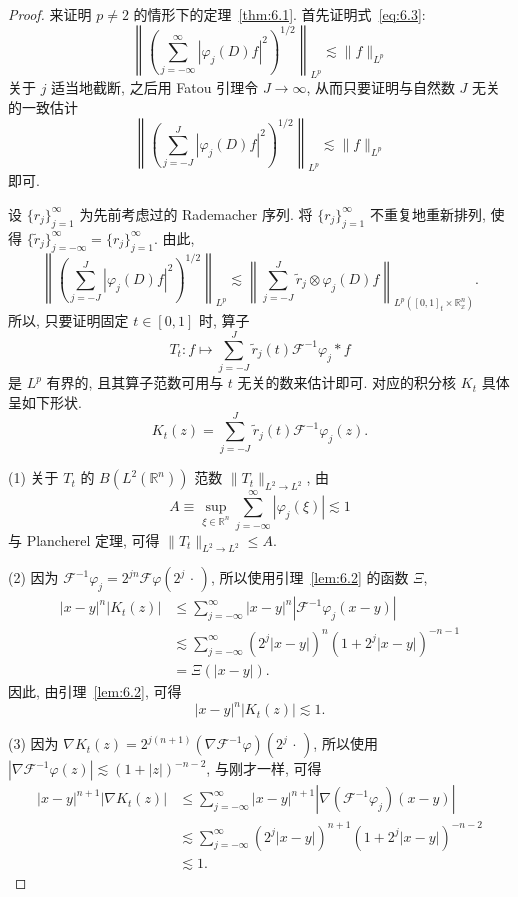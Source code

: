 \begin{proof}
来证明 $p \neq 2$ 的情形下的定理~\ref{thm:6.1}. 首先证明式~\eqref{eq:6.3}:
\begin{equation}\tag{6.3}
\left\|\left(\sum_{j=-\infty}^{\infty}|\varphi_{j}(D)f|^{2}\right)^{1/2}\right\|_{L^{p}} \lesssim \|f\|_{L^{p}}
\label{eq:6.3}
\end{equation}
关于 $j$ 适当地截断, 之后用 Fatou 引理令 $J \to \infty$, 从而只要证明与自然数 $J$ 无关的一致估计
\[
\left\|\left(\sum_{j=-J}^{J}|\varphi_{j}(D)f|^{2}\right)^{1/2}\right\|_{L^{p}} \lesssim \|f\|_{L^{p}}
\]
即可.

设 $\{r_{j}\}_{j=1}^{\infty}$ 为先前考虑过的 Rademacher 序列. 将 $\{r_{j}\}_{j=1}^{\infty}$ 不重复地重新排列, 使得 $\{\tilde{r}_{j}\}_{j=-\infty}^{\infty} = \{r_{j}\}_{j=1}^{\infty}$. 由此,
\[
\left\|\left(\sum_{j=-J}^{J}|\varphi_{j}(D)f|^{2}\right)^{1/2}\right\|_{L^{p}} \lesssim \left\|\sum_{j=-J}^{J}\tilde{r}_{j} \otimes \varphi_{j}(D)f\right\|_{L^{p}([0,1]_{t} \times \mathbb{R}^{n}_{x})}.
\]
所以, 只要证明固定 $t \in [0,1]$ 时, 算子
\[
T_{t}: f \mapsto \sum_{j=-J}^{J}\tilde{r}_{j}(t)\mathcal{F}^{-1}\varphi_{j} * f
\]
是 $L^{p}$ 有界的, 且其算子范数可用与 $t$ 无关的数来估计即可. 对应的积分核 $K_{t}$ 具体呈如下形状.
\[
K_{t}(z) = \sum_{j=-J}^{J}\tilde{r}_{j}(t)\mathcal{F}^{-1}\varphi_{j}(z).
\]

(1) 关于 $T_{t}$ 的 $B(L^{2}(\mathbb{R}^{n}))$ 范数 $\|T_{t}\|_{L^{2} \to L^{2}}$, 由
\[
A \equiv \sup_{\xi \in \mathbb{R}^{n}}\sum_{j=-\infty}^{\infty}|\varphi_{j}(\xi)| \lesssim 1
\]
与 Plancherel 定理, 可得 $\|T_{t}\|_{L^{2} \to L^{2}} \leq A$.

(2) 因为 $\mathcal{F}^{-1}\varphi_{j} = 2^{jn}\mathcal{F}\varphi(2^{j}\,\cdot\,)$, 所以使用引理~\ref{lem:6.2} 的函数 $\Xi$,
\[
\begin{aligned}
|x-y|^{n}|K_{t}(z)| &\leq \sum_{j=-\infty}^{\infty}|x-y|^{n}|\mathcal{F}^{-1}\varphi_{j}(x-y)| \\
&\lesssim \sum_{j=-\infty}^{\infty}(2^{j}|x-y|)^{n}(1 + 2^{j}|x-y|)^{-n-1} \\
&= \Xi(|x-y|).
\end{aligned}
\]
因此, 由引理~\ref{lem:6.2}, 可得
\[
|x-y|^{n}|K_{t}(z)| \lesssim 1.
\]

(3) 因为 $\nabla K_{t}(z) = 2^{j(n+1)}(\nabla\mathcal{F}^{-1}\varphi)(2^{j}\,\cdot\,)$, 所以使用 $|\nabla\mathcal{F}^{-1}\varphi(z)| \lesssim (1+|z|)^{-n-2}$, 与刚才一样, 可得
\[
\begin{aligned}
|x-y|^{n+1}|\nabla K_{t}(z)| &\leq \sum_{j=-\infty}^{\infty}|x-y|^{n+1}|\nabla(\mathcal{F}^{-1}\varphi_{j})(x-y)| \\
&\lesssim \sum_{j=-\infty}^{\infty}(2^{j}|x-y|)^{n+1}(1 + 2^{j}|x-y|)^{-n-2} \\
&\lesssim 1.
\end{aligned}
\]


\end{proof}
